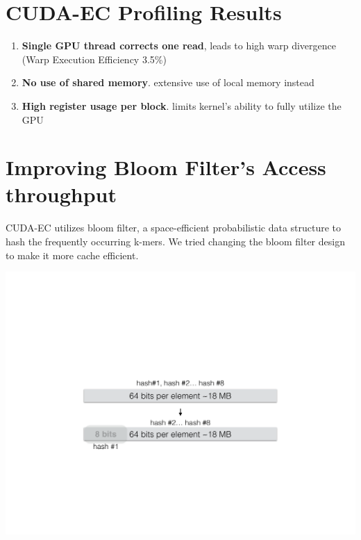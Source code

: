 \documentclass[a0,portrait]{a0poster}
\begin{document}
\begin{multicols}{2}


\color{DarkRed} 
\section*{CUDA-EC Profiling Results}
\color{Black} 

\begin{enumerate}
\item \textbf{Single GPU thread corrects one read}, leads to high warp divergence (Warp Execution Efficiency 3.5\%)
\item \textbf{No use of shared memory}. extensive use of local memory instead
\item \textbf{High register usage per block}. limits kernel's ability to fully utilize the GPU
\end{enumerate}


\color{DarkRed} 
\section*{Improving Bloom Filter's Access throughput}
\color{Black} 
CUDA-EC utilizes bloom filter, a space-efficient probabilistic data structure to hash the frequently occurring k-mers. We tried changing the bloom filter design to make it more cache efficient.
\begin{minipage}{.235\textwidth}
\includegraphics[width=\textwidth]{Hash_Change.pdf}
\end{minipage}
\begin{minipage}{0.235\textwidth}

\end{minipage}
\vspace{1cm}


\end{multicols}
\end{document}
